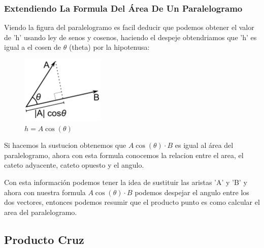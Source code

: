 \documentclass{article}
\begin{document}
\subsubsection*{Extendiendo La Formula Del Área De Un Paralelogramo}
\label{sec:org7c62cf8}
Viendo la figura del paralelogramo es facil deducir que podemos obtener el valor de 'h' usando ley de senos y cosenos, haciendo el despeje obtendriamos que 'h' es igual a el cosen de \(\theta\) (theta) por la hipotenusa:

\begin{figure}[htbp]
\centering
\includegraphics[width=4cm]{img/despeje-paralelogramo.png}
\caption{\(h = A \cos(\theta)\)}
\end{figure}

Si hacemos la sustucion obtenemos que \(A \cos(\theta) \cdot B\) es igual al área del paralelogramo, ahora con esta formula conocemos la relacion entre el area, el cateto adyacente, cateto opuesto y el angulo. 

Con esta información podemos tener la idea de sustituir las aristas 'A' y 'B' y ahora con nuestra formula \(A \cos(\theta) \cdot B\) podemos despejar el angulo entre los dos vectores, entonces podemos resumir que el producto punto es como calcular el area del paralelogramo.

\subsection{Producto Cruz}
\label{sec:org83c9413}
\end{document}
